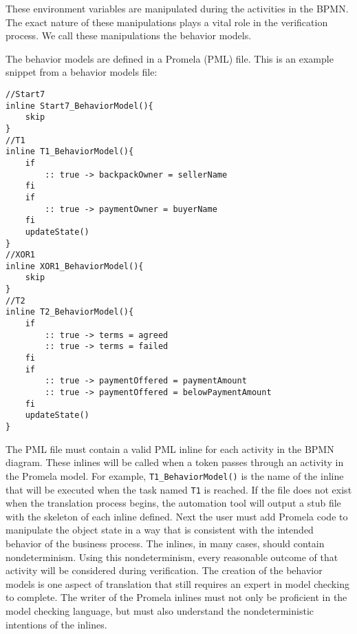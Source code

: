 These environment variables are manipulated during the activities in the BPMN. The exact nature of these manipulations plays a vital role in the verification process. We call these manipulations the behavior models.

The behavior models are defined in a Promela (PML) file. This is an example snippet from a behavior models file:
%
{\small
\begin{lstlisting}[style=myPromela]
//Start7
inline Start7_BehaviorModel(){
	skip
}
//T1
inline T1_BehaviorModel(){
	if
		:: true -> backpackOwner = sellerName
	fi
	if
		:: true -> paymentOwner = buyerName
	fi
	updateState()
}
//XOR1
inline XOR1_BehaviorModel(){
	skip
}
//T2
inline T2_BehaviorModel(){
	if
		:: true -> terms = agreed
		:: true -> terms = failed
	fi
	if
		:: true -> paymentOffered = paymentAmount
		:: true -> paymentOffered = belowPaymentAmount
	fi
	updateState()
}
\end{lstlisting}
}
%
The PML file must contain a valid PML inline for each activity in the BPMN diagram. These inlines will be called when a token passes through an activity in the Promela model. For example, \lstinline[style=myPromela]{T1_BehaviorModel()}
is the name of the inline that will be executed when the task named \lstinline[style=mypromela]{T1} 
is reached. If the file does not exist when the translation process begins, the automation tool will output a stub file with the skeleton of each inline defined.
Next the user must add Promela code to manipulate the object state in a way that is consistent with the intended behavior of the business process.  The inlines, in many cases, should contain nondeterminism. Using this nondeterminism, every reasonable outcome of that activity will be considered during verification. The creation of the behavior models is one aspect of translation that still requires an expert in model checking to complete. The writer of the Promela inlines must not only be proficient in the model checking language, but must also understand the nondeterministic intentions of the inlines.

